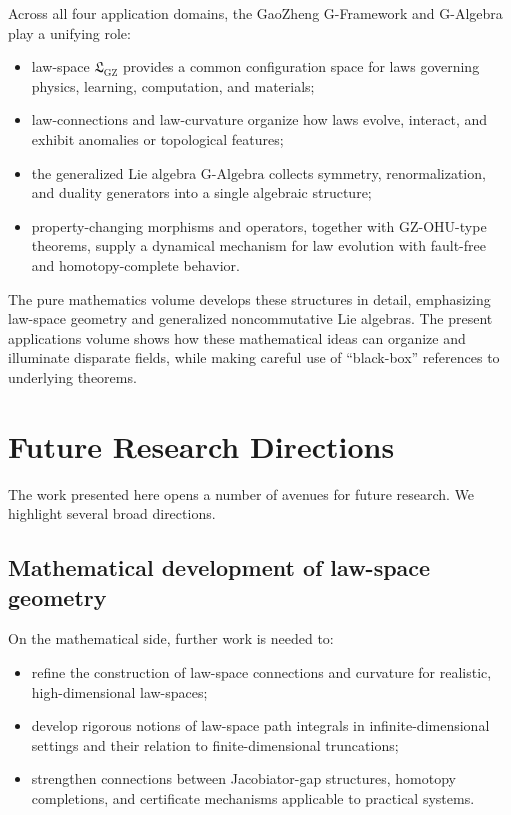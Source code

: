 \documentclass[11pt]{book}
\newcommand{\GAlgebra}{\text{G-Algebra}}
\newcommand{\GZLS}{\ensuremath{\mathfrak{L}_{\mathrm{GZ}}}}
\theoremstyle{plain}
\theoremstyle{definition}
\theoremstyle{remark}
\begin{document}
Across all four application domains, the GaoZheng G-Framework and
G-Algebra play a unifying role:
\begin{itemize}
  \item law-space $\GZLS$ provides a common configuration space for
        laws governing physics, learning, computation, and materials;
  \item law-connections and law-curvature organize how laws evolve,
        interact, and exhibit anomalies or topological features;
  \item the generalized Lie algebra $\GAlgebra$ collects symmetry,
        renormalization, and duality generators into a single
        algebraic structure;
  \item property-changing morphisms and operators, together with
        GZ-OHU-type theorems, supply a dynamical mechanism for
        law evolution with fault-free and homotopy-complete behavior.
\end{itemize}

The pure mathematics volume\cite{GaoZheng2025GFramework} develops these
structures in detail, emphasizing law-space geometry and generalized
noncommutative Lie algebras. The present applications volume shows
how these mathematical ideas can organize and illuminate disparate
fields, while making careful use of ``black-box'' references to
underlying theorems.

\section*{Future Research Directions}


The work presented here opens a number of avenues for future
research. We highlight several broad directions.

\subsection*{Mathematical development of law-space geometry}

On the mathematical side, further work is needed to:
\begin{itemize}
  \item refine the construction of law-space connections and
        curvature for realistic, \\high-dimensional law-spaces;
  \item develop rigorous notions of law-space path integrals in
        infinite-dimensional settings and their relation to
        finite-dimensional truncations;
  \item strengthen connections between Jacobiator-gap structures,
        homotopy completions, and certificate mechanisms applicable
        to practical systems.
\end{itemize}
\end{document}

